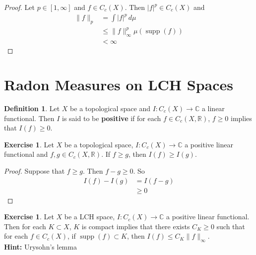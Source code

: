 \documentclass{book}
\theoremstyle{definition}
\newtheorem{defn}[definition]{Definition}
\newtheorem{ex}[definition]{Exercise}
\newcommand{\C}{\mathbb{C}}
\newcommand{\R}{\mathbb{R}}
\newcommand{\lex}[1]{\label{ex:#1}}
\newcommand{\ld}[1]{\label{defn:#1}}
\DeclareMathOperator{\supp}{supp}
\DeclareMathOperator*{\0}{\mbf{0}}
\DeclareMathOperator*{\1}{\mbf{1}}
\newcommand{\dmu}{\, d \mu}
\begin{document}
	\begin{proof}
	Let $p \in [1, \infty]$ and $f \in C_c(X)$. Then $|f|^p \in C_c(X)$ and 
	\begin{align*}
	\|f\|_p 
	&= \int |f|^p \dmu \\
	& \leq \|f\|_{\infty}^p \mu(\supp (f)) \\
	& < \infty
\end{align*}	 
	\end{proof}
	
	
	
	
	
	
	
	
	
	
	
	
	\newpage	
	\section{Radon Measures on LCH Spaces}
	
	\begin{defn} \ld{00000} 
	Let $X$ be a topological space and $I: C_c(X) \rightarrow \C$ a linear functional. Then $I$ is said to be \textbf{positive} if for each $f \in C_c(X, \R)$, $f \geq 0 $ implies that $I(f) \geq 0$.
	\end{defn}
	
	\begin{ex} \lex{00000} 
	Let $X$ be a topological space, $I: C_c(X) \rightarrow \C$ a positive linear functional and $f,g \in C_c(X, \R)$. If $f \geq g$, then $I(f) \geq I (g)$.  
	\end{ex}	
	
	\begin{proof}
	Suppose that $f \geq g$. Then $f - g \geq 0$. So 
	\begin{align*}
	I(f) - I(g) 
	&= I(f -g) \\
	&\geq 0
	\end{align*}
	\end{proof}
	
	
	
	\begin{ex} \lex{00000} 
	Let $X$ be a LCH space, $I: C_c(X) \rightarrow \C$ a positive linear functional. Then for each $K \subset X$, $K $ is compact implies that there exists $C_K \geq 0$ such that for each $f \in C_c(X)$, if $\supp(f) \subset K$, then $I(f) \leq C_K \|f\|_{\infty}$.\\
	\textbf{Hint:} Urysohn's lemma 
	\end{ex}
	
\end{document}
